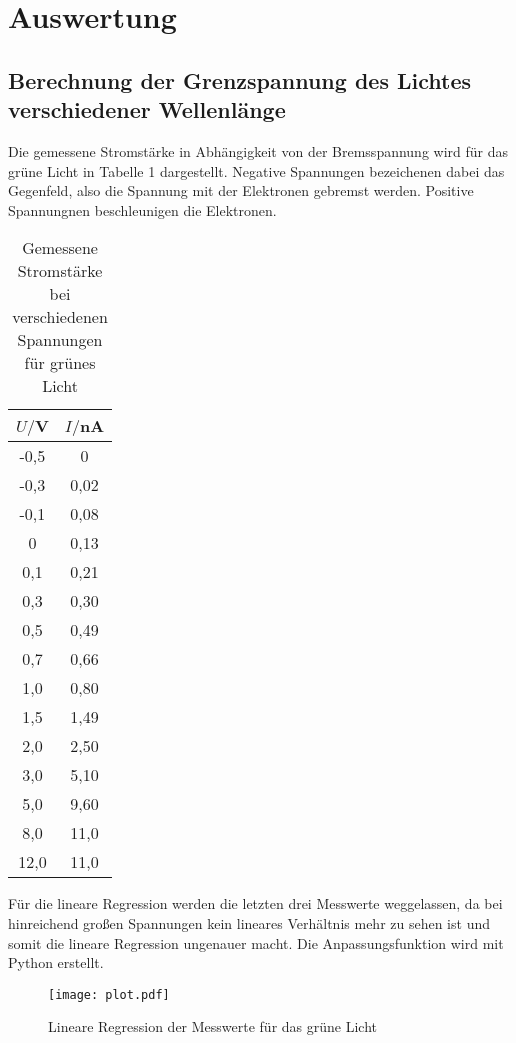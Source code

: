 \section{Auswertung}
\label{sec:Auswertung}

\subsection{Berechnung der Grenzspannung des Lichtes verschiedener Wellenlänge}


Die gemessene Stromstärke in Abhängigkeit von der Bremsspannung wird für das grüne
Licht in Tabelle 1 dargestellt. Negative Spannungen bezeichenen dabei das Gegenfeld, also
die Spannung mit der Elektronen gebremst werden. Positive Spannungnen beschleunigen die Elektronen.


\begin{table}[H]
  \centering
  \caption{Gemessene Stromstärke bei verschiedenen Spannungen für grünes Licht}
  \label{tab:Spannungsamplitude}
  \begin{tabular}{c c}
    \toprule
    $U/$V & $I/$nA \\
    \midrule
    -0,5 & 0 \\
    -0,3 & 0,02 \\
    -0,1 & 0,08 \\
     0	 & 0,13 \\
     0,1 & 0,21 \\
     0,3 & 0,30 \\
     0,5 & 0,49 \\
     0,7 & 0,66 \\
     1,0 & 0,80 \\
     1,5 & 1,49 \\
     2,0 & 2,50 \\
     3,0 & 5,10 \\
     5,0 & 9,60 \\
     8,0 & 11,0 \\
    12,0 & 11,0 \\
    \bottomrule
  \end{tabular}
\end{table}

Für die lineare Regression werden die letzten drei Messwerte weggelassen, da bei hinreichend
großen Spannungen kein lineares Verhältnis mehr zu sehen ist und somit die lineare Regression
ungenauer macht. Die Anpassungsfunktion wird mit Python erstellt.

\begin{figure}[H]
  \centering
  \texttt{[image: plot.pdf]}
  \caption{Lineare Regression der Messwerte für das grüne Licht}
  \label{fig:plot}
\end{figure}

